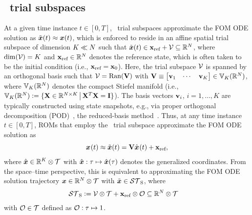 \documentclass[3p,computermodern,10pt]{elsarticle}
\begin{document}
\subsection{\spatialAcronym\ trial subspaces}
At a given time instance 
$t\in[0,T]$,
\spatialAcronym\ trial subspaces approximate the FOM ODE solution
	as $\tilde{\boldsymbol x}(t)\approx{\boldsymbol x}(t)$, which is enforced to reside in an
	affine spatial trial subspace of dimension $K\ll N$ such that
	$\tilde{\boldsymbol x}(t)\in
	\mathbf{x}_\text{ref}+\mathcal{V }
\subseteq\mathbb{R}^{N}$, where $\dim(\mathcal{V }) = K$
and $\mathbf{x}_\text{ref} \in \mathbb{R}^{N}$ denotes the reference state, which
	is often taken to be the initial condition (i.e., $\mathbf{x}_\text{ref} = {{\mathbf{x}}_0}$).
Here, the trial subspace
$\mathcal{V }$ 
is spanned by an orthogonal basis such that
$ \mathcal{V }= \mathrm{Ran}(\mathbf {V})$
with 
$ \mathbf {V} \equiv \begin{bmatrix}  \mathbf{v}_1  & \cdots &  \mathbf{v}_K \end{bmatrix}
	\in \mathbb{V}_{K}(\mathbb{R}^{N})$, where $\mathbb{V}_{K}(\mathbb{R}^{N})$ denotes the compact Stiefel manifold (i.e.,  $
	\mathbb{V}_{K}(\mathbb{R}^{N})\vcentcolon=
	\{ \mathbf{X} \in \mathbb{R}^{N
	\times K}\, \big|\, \mathbf{X}^T \mathbf{X} = \mathbf{I} \}$).
The basis vectors $\mathbf{v}_i$, $i=1,\ldots,K$ are typically constructed
using state snapshots, e.g., via
proper orthogonal decomposition (POD)~\cite{berkooz_turbulence_pod}, the reduced-basis method~\cite{rb_1,rb_2,rb_3,NgocCuong2005,Rozza2008}. 
Thus, at any time instance $t\in[0,T]$, ROMs that employ the  \spatialAcronym\
trial subspace approximate the FOM ODE solution as
\begin{equation}\label{eq:affine_trialspace}
{\boldsymbol x}^{}(t) \approx \tilde{\boldsymbol x}(t) = \mathbf {V} \hat{ \boldsymbol x}^{}(t) + \mathbf{x}_\text{ref},
\end{equation}
where $\hat{ \boldsymbol x} \in \mathbb{R}^{K} \otimes \mathcal{T}$ with
$\hat{ \boldsymbol x}:\tau\mapsto\hat{ \boldsymbol x}(\tau)$
denotes the generalized
coordinates. From the space--time perspective, this is equivalent to approximating the
	FOM ODE solution trajectory ${\boldsymbol x}\in\mathbb{R}^{N}\otimes\mathcal{T}$ with 
	$\tilde{\boldsymbol x}\in \mathcal{ ST }_{\text{S}}$, where
\begin{equation}\label{eq:spatial_subspace}
\begin{split}
& \mathcal{ ST }_{\text{S}} \vcentcolon= \mathcal{V } \otimes \mathcal{T} +
	\mathbf{x}_\text{ref}\otimes\mathcal{O}\subseteq\mathbb{R}^{N}\otimes\mathcal{T}
\end{split}
\end{equation}
with $\mathcal{O}\in\mathcal{T}$ defined as
$\mathcal{O}:\tau\mapsto 1$.
	 
\end{document}
